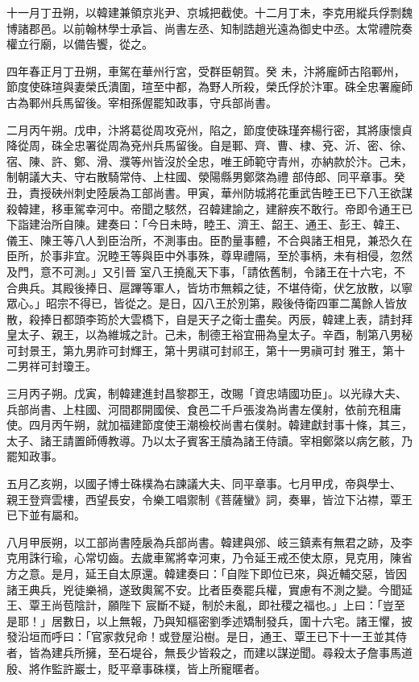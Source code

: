 \begin{pinyinscope}
 十一月丁丑朔，以韓建兼領京兆尹、京城把截使。十二月丁未，李克用縱兵俘剽魏博諸郡邑。以前翰林學士承旨、尚書左丞、知制誥趙光遠為御史中丞。太常禮院奏權立行廟，以備告饗，從之。



 四年春正月丁丑朔，車駕在華州行宮，受群臣朝賀。癸
 未，汴將龐師古陷鄆州，節度使硃瑄與妻榮氏潰圍，瑄至中都，為野人所殺，榮氏俘於汴軍。硃全忠署龐師古為鄆州兵馬留後。宰相孫偓罷知政事，守兵部尚書。



 二月丙午朔。戊申，汴將葛從周攻兗州，陷之，節度使硃瑾奔楊行密，其將康懷貞降從周，硃全忠署從周為兗州兵馬留後。自是鄆、齊、曹、棣、兗、沂、密、徐、宿、陳、許、鄭、滑、濮等州皆沒於全忠，唯王師範守青州，亦納款於汴。己未，制朝議大夫、守右散騎常侍、上柱國、滎陽縣男鄭綮為禮
 部侍郎、同平章事。癸丑，責授硤州刺史陸扆為工部尚書。甲寅，華州防城將花重武告睦王已下八王欲謀殺韓建，移車駕幸河中。帝聞之駭然，召韓建諭之，建辭疾不敢行。帝即令通王已下詣建治所自陳。建奏曰：「今日未時，睦王、濟王、韶王、通王、彭王、韓王、儀王、陳王等八人到臣治所，不測事由。臣酌量事體，不合與諸王相見，兼恐久在臣所，於事非宜。況睦王等與臣中外事殊，尊卑禮隔，至於事柄，未有相侵，忽然及門，意不可測。」又引晉
 室八王撓亂天下事，「請依舊制，令諸王在十六宅，不合典兵。其殿後捧日、扈蹕等軍人，皆坊市無賴之徒，不堪侍衛，伏乞放散，以寧眾心。」昭宗不得已，皆從之。是日，囚八王於別第，殿後侍衛四軍二萬餘人皆放散，殺捧日都頭李筠於大雲橋下，自是天子之衛士盡矣。丙辰，韓建上表，請封拜皇太子、親王，以為維城之計。己未，制德王裕宜冊為皇太子。辛酉，制第八男秘可封景王，第九男祚可封輝王，第十男祺可封祁王，第十一男禛可封
 雅王，第十二男祥可封瓊王。



 三月丙子朔。戊寅，制韓建進封昌黎郡王，改賜「資忠靖國功臣」。以光祿大夫、兵部尚書、上柱國、河間郡開國侯、食邑二千戶張浚為尚書左僕射，依前充租庸使。四月丙午朔，就加福建節度使王潮檢校尚書右僕射。韓建獻封事十條，其三，太子、諸王請置師傅教導。乃以太子賓客王牘為諸王侍讀。宰相鄭綮以病乞骸，乃罷知政事。



 五月乙亥朔，以國子博士硃樸為右諫議大夫、同平章事。七月甲戌，帝與學士、
 親王登齊雲樓，西望長安，令樂工唱禦制《菩薩蠻》詞，奏畢，皆泣下沾襟，覃王已下並有屬和。



 八月甲辰朔，以工部尚書陸扆為兵部尚書。韓建與邠、岐三鎮素有無君之跡，及李克用誅行瑜，心常切齒。去歲車駕將幸河東，乃令延王戒丕使太原，見克用，陳省方之意。是月，延王自太原還。韓建奏曰：「自陛下即位已來，與近輔交惡，皆因諸王典兵，兇徒樂禍，遂致輿駕不安。比者臣奏罷兵權，實慮有不測之變。今聞延王、覃王尚苞陰計，願陛下
 宸斷不疑，制於未亂，即社稷之福也。」上曰：「豈至是耶！」居數日，以上無報，乃與知樞密劉季述矯制發兵，圍十六宅。諸王懼，披發沿垣而呼曰：「官家救兒命！或登屋沿樹。是日，通王、覃王已下十一王並其侍者，皆為建兵所擁，至石堤谷，無長少皆殺之，而建以謀逆聞。尋殺太子詹事馬道殷、將作監許巖士，貶平章事硃樸，皆上所寵暱者。




\end{pinyinscope}
